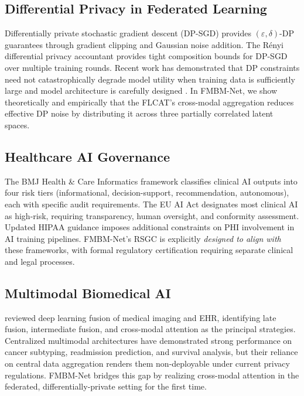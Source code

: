 \documentclass[a4paper,fleqn]{cas-dc}
\begin{document}
\subsection{Differential Privacy in Federated Learning}

Differentially private stochastic gradient descent (DP-SGD)
\citep{abadi2016dpsgd} provides $(\varepsilon,\delta)$-DP guarantees through
gradient clipping and Gaussian noise addition. The R\'{e}nyi differential
privacy accountant \citep{mironov2017renyi} provides tight composition bounds
for DP-SGD over multiple training rounds. Recent work has demonstrated that DP
constraints need not catastrophically degrade model utility when training data
is sufficiently large and model architecture is carefully designed
\citep{li2021moon}. In FMBM-Net, we show theoretically and empirically that the
FLCAT's cross-modal aggregation reduces effective DP noise by distributing it
across three partially correlated latent spaces.

\subsection{Healthcare AI Governance}

The BMJ Health \& Care Informatics framework \citep{bmj_governance_2026}
classifies clinical AI outputs into four risk tiers (informational,
decision-support, recommendation, autonomous), each with specific audit
requirements. The EU AI Act \citep{eu_ai_act_2024} designates most clinical AI
as high-risk, requiring transparency, human oversight, and conformity
assessment. Updated HIPAA guidance \citep{hipaa_guidance_2024} imposes
additional constraints on PHI involvement in AI training pipelines.
FMBM-Net's RSGC is explicitly \emph{designed to align with} these frameworks,
with formal regulatory certification requiring separate clinical and legal
processes.

\subsection{Multimodal Biomedical AI}

\citet{huang2021multimodal} reviewed deep learning fusion of medical imaging and EHR, identifying late fusion, intermediate fusion, and cross-modal attention as the principal strategies. Centralized multimodal architectures have demonstrated strong performance on cancer subtyping, readmission prediction,
and survival analysis, but their reliance on central data aggregation renders them non-deployable under current privacy regulations. FMBM-Net bridges this gap by realizing cross-modal attention in the federated, differentially-private setting for the first time.
\end{document}
